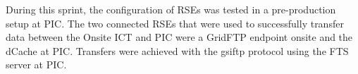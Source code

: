 During this sprint, the configuration of RSEs was tested in a pre-production
setup at PIC.
The two connected RSEs that were used to successfully transfer
data between the Onsite ICT and PIC were a GridFTP endpoint onsite and the dCache at PIC.
Transfers were achieved with the gsiftp protocol using the FTS server at PIC.

